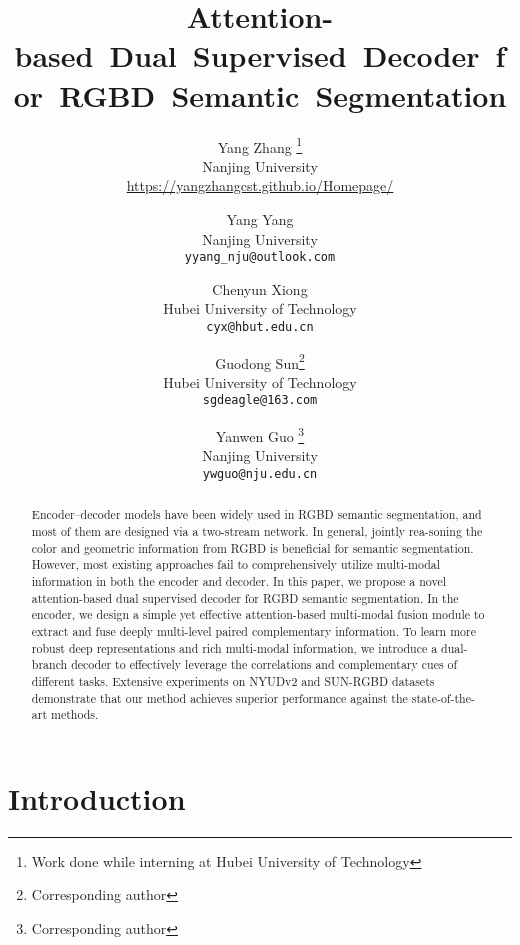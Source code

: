 \documentclass[10pt,twocolumn,letterpaper]{article}
\begin{document}
\title{Attention-based~Dual~Supervised~Decoder~for~RGBD~Semantic~Segmentation}

\author{Yang Zhang \thanks{Work done while interning at Hubei University of Technology}\\
Nanjing University\\
{\small \url{https://yangzhangcst.github.io/Homepage/}}
\and
Yang Yang  \\
Nanjing University\\
{\tt\small yyang\_nju@outlook.com}
\and
Chenyun Xiong\\
Hubei University of Technology\\
{\tt\small cyx@hbut.edu.cn}
\and
Guodong Sun\thanks{Corresponding author}\\
Hubei University of Technology\\
{\tt\small sgdeagle@163.com}
\and
Yanwen Guo \thanks{Corresponding author}\\
Nanjing University\\
{\tt\small ywguo@nju.edu.cn}
}

\maketitle


\begin{abstract}
	Encoder–decoder models have been widely used in RGBD semantic segmentation, and most of them are designed via a two-stream network. In general, jointly rea-soning the color and geometric information from RGBD is beneficial for semantic segmentation. However, most existing approaches fail to comprehensively utilize multi-modal information in both the encoder and decoder. In this paper, we propose a novel attention-based dual supervised decoder for RGBD semantic segmentation. In the encoder, we design a simple yet effective attention-based multi-modal fusion module to extract and fuse deeply multi-level paired complementary information. To learn more robust deep representations and rich multi-modal information, we introduce a dual-branch decoder to effectively leverage the correlations and complementary cues of different tasks. Extensive experiments on NYUDv2 and SUN-RGBD datasets demonstrate that our method achieves superior performance against the state-of-the-art methods.
\end{abstract}

\section{Introduction}\label{sec:introduction}
\end{document}
